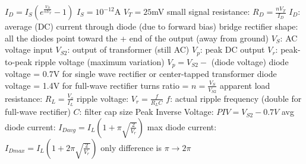 \documentclass[12pt]{article}
\begin{document}
\begin{spacing}{0.8}
\begin{multicols*}{2}
\begin{flushleft}
\begin{outline}[longenum]
  \1 $I_D = I_S \left( e^{\frac{V_D}{n V_T}} - 1 \right)$
    \2 $I_S=10^{-12}$A
    \2 $V_T=25$mV
  \1 small signal resistance: $R_D = \frac{nV_T}{I_D}$
    \2 $I_D$: average (DC) current through diode (due to forward bias)
  \1 bridge rectifier shape: all the diodes point toward the + end of the output (away from ground)
  \1 $V_S$: AC voltage input
  \1 $V_{S2}$: output of transformer (still AC)
  \1 $V_p$: peak DC output
  \2 $V_r$: peak-to-peak ripple voltage (maximum variation)
  \1 $V_p=V_{S2}-$ (diode voltage)
    \2 diode voltage = 0.7V for single wave rectifier or center-tapped transformer
    \2 diode voltage = 1.4V for full-wave rectifier
  \1 turns ratio = $n=\frac{V_S}{V_{S2}}$
  \1 apparent load resistance: $R_L = \frac{V_o}{I_L}$
  \1 ripple voltage: $V_r=\frac{f}{R_L C}$
    \2 $f$: actual ripple frequency (double for full-wave rectifier)
    \2 $C$: filter cap size
  \1 Peak Inverse Voltage: $ PIV = V_{S2}-0.7V$
  \1 avg diode current: $I_{Davg}=I_L \left( 1+\pi\sqrt{\frac{2}{V_r}} \right)$
  \1 max diode current: $I_{Dmax}=I_L \left( 1+2\pi\sqrt{\frac{2}{V_r}} \right)$
    \2 only difference is $\pi \rightarrow 2\pi$






\end{outline}
\end{flushleft}
\end{multicols*}
\end{spacing}
\end{document}
